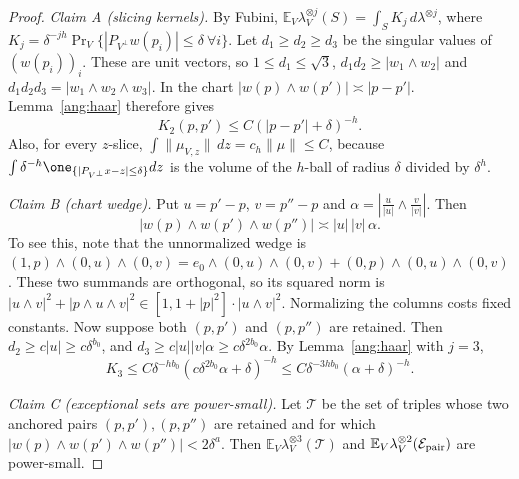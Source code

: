 \begin{proof}
\emph{Claim A (slicing kernels).} By Fubini, $\mathbb E_V\lambda_V^{\otimes j}(S)=\int_S K_j\,d\lambda^{\otimes j}$, where $K_j=\delta^{-jh}\Pr_V\{|P_{V^\perp}w(p_i)|\le\delta\ \forall i\}$. Let $d_1\ge d_2\ge d_3$ be the singular values of $(w(p_i))_i$. These are unit vectors, so $1\le d_1\le\sqrt3$, $d_1d_2\ge|w_1\wedge w_2|$ and $d_1d_2d_3=|w_1\wedge w_2\wedge w_3|$. In the chart $|w(p)\wedge w(p')|\asymp|p-p'|$. Lemma~\ref{ang:haar} therefore gives
\[
 K_2(p,p')\le C(|p-p'|+\delta)^{-h}.
\]
Also, for every $z$-slice, $\int\|\mu_{V,z}\|\,dz=c_h\|\mu\|\le C$, because $\int\delta^{-h}\one_{\{|P_{V^\perp}x-z|\le\delta\}}dz$ is the volume of the $h$-ball of radius $\delta$ divided by $\delta^h$.

\emph{Claim B (chart wedge).} Put $u=p'-p$, $v=p''-p$ and $\alpha=|\frac{u}{|u|}\wedge\frac{v}{|v|}|$. Then
\[
 |w(p)\wedge w(p')\wedge w(p'')|\asymp|u|\,|v|\,\alpha .
\]
To see this, note that the unnormalized wedge is $(1,p)\wedge(0,u)\wedge(0,v)=e_0\wedge(0,u)\wedge(0,v)+(0,p)\wedge(0,u)\wedge(0,v)$. These two summands are orthogonal, so its squared norm is $|u\wedge v|^2+|p\wedge u\wedge v|^2\in[1,1+|p|^2]\cdot|u\wedge v|^2$. Normalizing the columns costs fixed constants. Now suppose both $(p,p')$ and $(p,p'')$ are retained. Then $d_2\ge c|u|\ge c\delta^{b_0}$, and $d_3\ge c|u||v|\alpha\ge c\delta^{2b_0}\alpha$. By Lemma~\ref{ang:haar} with $j=3$,
\begin{equation}\label{eq:K3}
 K_3\le C\delta^{-hb_0}(c\delta^{2b_0}\alpha+\delta)^{-h}\le C\delta^{-3hb_0}(\alpha+\delta)^{-h}.
\end{equation}

\emph{Claim C (exceptional sets are power-small).} Let $\mathcal T$ be the set of triples whose two anchored pairs $(p,p'),(p,p'')$ are retained and for which $|w(p)\wedge w(p')\wedge w(p'')|<2\delta^a$. Then $\mathbb E_V\lambda_V^{\otimes3}(\mathcal T)$ and $\mathbb E_V\lambda_V^{\otimes2}(\mathcal E_{\rm pair})$ are power-small.


\end{proof}
